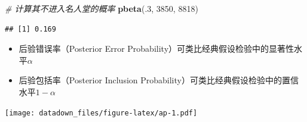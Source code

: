 \documentclass[
]{book}
\newenvironment{Shaded}{\begin{snugshade}}{\end{snugshade}}
\newcommand{\CommentTok}[1]{\textcolor[rgb]{0.56,0.35,0.01}{\textit{#1}}}
\newcommand{\DataTypeTok}[1]{\textcolor[rgb]{0.13,0.29,0.53}{#1}}
\newcommand{\DecValTok}[1]{\textcolor[rgb]{0.00,0.00,0.81}{#1}}
\newcommand{\FloatTok}[1]{\textcolor[rgb]{0.00,0.00,0.81}{#1}}
\newcommand{\KeywordTok}[1]{\textcolor[rgb]{0.13,0.29,0.53}{\textbf{#1}}}
\newcommand{\NormalTok}[1]{#1}
\newcommand{\OperatorTok}[1]{\textcolor[rgb]{0.81,0.36,0.00}{\textbf{#1}}}
\newcommand{\StringTok}[1]{\textcolor[rgb]{0.31,0.60,0.02}{#1}}
\begin{document}
\begin{Shaded}
\begin{Highlighting}[]
\CommentTok{# 计算其不进入名人堂的概率}
\KeywordTok{pbeta}\NormalTok{(.}\DecValTok{3}\NormalTok{, }\DecValTok{3850}\NormalTok{, }\DecValTok{8818}\NormalTok{)}
\end{Highlighting}
\end{Shaded}

\begin{verbatim}
## [1] 0.169
\end{verbatim}

\begin{itemize}
\item
  后验错误率（Posterior Error Probability）可类比经典假设检验中的显著性水平\(\alpha\)
\item
  后验包括率（Posterior Inclusion Probability）可类比经典假设检验中的置信水平\(1-\alpha\)
\end{itemize}

\begin{Shaded}
\end{Shaded}

\texttt{[image: datadown\_files/figure-latex/ap-1.pdf]}
\end{document}
